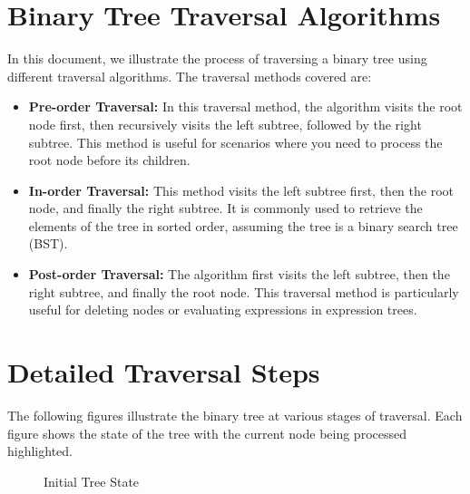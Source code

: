 \documentclass[10pt,a4paper]{article}
\begin{document}
\section*{Binary Tree Traversal Algorithms}
In this document, we illustrate the process of traversing a binary tree using different traversal algorithms. The traversal methods covered are:

\begin{itemize}
    \item \textbf{Pre-order Traversal:} 
    In this traversal method, the algorithm visits the root node first, then recursively visits the left subtree, followed by the right subtree. This method is useful for scenarios where you need to process the root node before its children.

    \item \textbf{In-order Traversal:}
    This method visits the left subtree first, then the root node, and finally the right subtree. It is commonly used to retrieve the elements of the tree in sorted order, assuming the tree is a binary search tree (BST).

    \item \textbf{Post-order Traversal:}
    The algorithm first visits the left subtree, then the right subtree, and finally the root node. This traversal method is particularly useful for deleting nodes or evaluating expressions in expression trees.
\end{itemize}

\section*{Detailed Traversal Steps}
The following figures illustrate the binary tree at various stages of traversal. Each figure shows the state of the tree with the current node being processed highlighted.

\begin{figure}[h!]
\centering
\begin{minipage}{0.8\textwidth}
    \centering
    \caption{Initial Tree State}
\end{minipage}
\vspace{1cm}
\end{figure}
\end{document}
